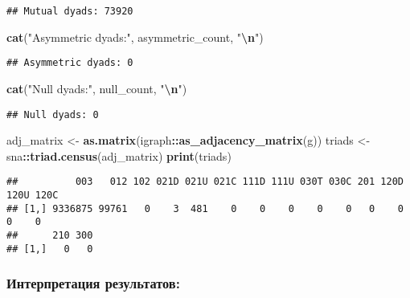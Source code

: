 \documentclass[
]{article}
\newenvironment{Shaded}{\begin{snugshade}}{\end{snugshade}}
\newcommand{\FunctionTok}[1]{\textcolor[rgb]{0.13,0.29,0.53}{\textbf{#1}}}
\newcommand{\NormalTok}[1]{#1}
\newcommand{\OtherTok}[1]{\textcolor[rgb]{0.56,0.35,0.01}{#1}}
\newcommand{\SpecialCharTok}[1]{\textcolor[rgb]{0.81,0.36,0.00}{\textbf{#1}}}
\newcommand{\StringTok}[1]{\textcolor[rgb]{0.31,0.60,0.02}{#1}}
\begin{document}
\begin{verbatim}
## Mutual dyads: 73920
\end{verbatim}

\begin{Shaded}
\begin{Highlighting}[]
\FunctionTok{cat}\NormalTok{(}\StringTok{"Asymmetric dyads:"}\NormalTok{, asymmetric\_count, }\StringTok{"}\SpecialCharTok{\textbackslash{}n}\StringTok{"}\NormalTok{)}
\end{Highlighting}
\end{Shaded}

\begin{verbatim}
## Asymmetric dyads: 0
\end{verbatim}

\begin{Shaded}
\begin{Highlighting}[]
\FunctionTok{cat}\NormalTok{(}\StringTok{"Null dyads:"}\NormalTok{, null\_count, }\StringTok{"}\SpecialCharTok{\textbackslash{}n}\StringTok{"}\NormalTok{)}
\end{Highlighting}
\end{Shaded}

\begin{verbatim}
## Null dyads: 0
\end{verbatim}

\begin{Shaded}
\begin{Highlighting}[]
\NormalTok{adj\_matrix }\OtherTok{\textless{}{-}} \FunctionTok{as.matrix}\NormalTok{(igraph}\SpecialCharTok{::}\FunctionTok{as\_adjacency\_matrix}\NormalTok{(g))}
\NormalTok{triads }\OtherTok{\textless{}{-}}\NormalTok{ sna}\SpecialCharTok{::}\FunctionTok{triad.census}\NormalTok{(adj\_matrix)}
\FunctionTok{print}\NormalTok{(triads)}
\end{Highlighting}
\end{Shaded}

\begin{verbatim}
##          003   012 102 021D 021U 021C 111D 111U 030T 030C 201 120D 120U 120C
## [1,] 9336875 99761   0    3  481    0    0    0    0    0   0    0    0    0
##      210 300
## [1,]   0   0
\end{verbatim}

\hypertarget{ux438ux43dux442ux435ux440ux43fux440ux435ux442ux430ux446ux438ux44f-ux440ux435ux437ux443ux43bux44cux442ux430ux442ux43eux432-2}{%
\subsubsection{Интерпретация
результатов:}\label{ux438ux43dux442ux435ux440ux43fux440ux435ux442ux430ux446ux438ux44f-ux440ux435ux437ux443ux43bux44cux442ux430ux442ux43eux432-2}}
\end{document}
